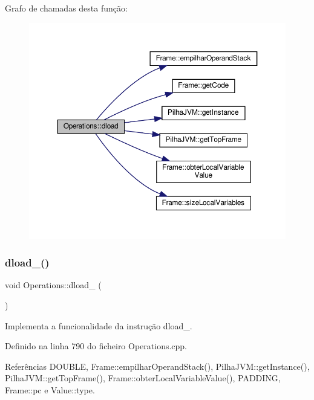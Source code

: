 Grafo de chamadas desta função\+:\nopagebreak
\begin{figure}[H]
\begin{center}
\leavevmode
\includegraphics[width=350pt]{classOperations_af53b0b32da7737741c20b4e313eaac84_cgraph}
\end{center}
\end{figure}
\mbox{\label{classOperations_a176a81199439e0b22d206c72ea4a1fba}} 
\subsubsection{\texorpdfstring{dload\+\_()}{dload\_0()}}
{\footnotesize\ttfamily void Operations\+::dload\+\_ (\begin{DoxyParamCaption}{ }\end{DoxyParamCaption})\hspace{0.3cm}{\ttfamily [private]}}



Implementa a funcionalidade da instrução dload\+\_. 



Definido na linha 790 do ficheiro Operations.\+cpp.



Referências D\+O\+U\+B\+LE, Frame\+::empilhar\+Operand\+Stack(), Pilha\+J\+V\+M\+::get\+Instance(), Pilha\+J\+V\+M\+::get\+Top\+Frame(), Frame\+::obter\+Local\+Variable\+Value(), P\+A\+D\+D\+I\+NG, Frame\+::pc e Value\+::type.



